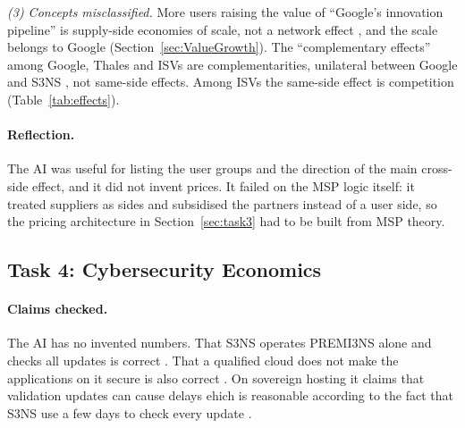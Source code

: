 \textit{(3) Concepts misclassified.} More users raising the value of ``Google's innovation pipeline'' is supply-side economies of scale, not a network effect \parencites[p.~124]{overby2021}[slide~5]{windekilde2026msp}, and the scale belongs to Google (Section~\ref{sec:ValueGrowth}). The ``complementary effects'' among Google, Thales and ISVs are complementarities, unilateral between Google and S3NS \parencite[p.~114]{overby2021}, not same-side effects. Among ISVs the same-side effect is competition (Table~\ref{tab:effects}).

\paragraph{Reflection.} The AI was useful for listing the user groups and the direction of the main cross-side effect, and it did not invent prices. It failed on the MSP logic itself: it treated suppliers as sides and subsidised the partners instead of a user side, so the pricing architecture in Section~\ref{sec:task3} had to be built from MSP theory.

\subsection{Task 4: Cybersecurity Economics}


\paragraph{Claims checked.}
The AI has no invented numbers. That S3NS operates PREMI3NS alone and checks all updates is correct \parencite{s3ns2025premi3ns}. That a qualified cloud does not make the applications on it secure is also correct \parencite{anssi_faq}. On sovereign hosting it claims that validation updates can cause delays ehich is reasonable according to the fact that S3NS use a few days to check every update \cite{paperjam2026}. 

